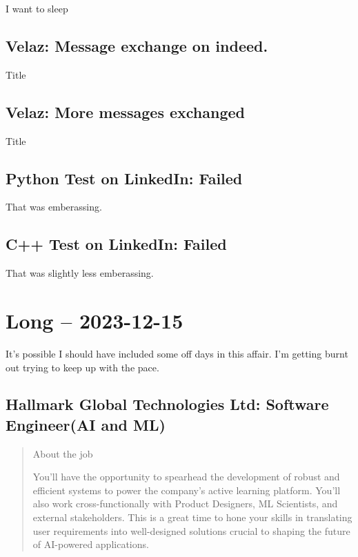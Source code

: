 \documentclass[
	letterpaper, %
	12pt, %
]{CSSullivanBusinessReport}
\begin{document}
I want to sleep



\subsection[Velaz]{Velaz: Message exchange on indeed. }

Title


\subsection[Velaz]{Velaz: More messages exchanged}

Title


\subsection[Python Test]{Python Test on LinkedIn: Failed}

That was emberassing. 


\subsection[C++ Test]{C++ Test on LinkedIn: Failed}

That was slightly less emberassing. 


\section[15 Dec: Short]{Long -- 2023-12-15} %

It's possible I should have included some off days in this affair. I'm getting burnt out trying to keep up with the pace. 


\subsection[Hallmark Global Technologies Ltd]{Hallmark Global Technologies Ltd: Software Engineer(AI and ML)}

\begin{quote}
	About the job
	
	You'll have the opportunity to spearhead the development of robust and efficient systems to power the company's active learning platform. You'll also work cross-functionally with Product Designers, ML Scientists, and external stakeholders. This is a great time to hone your skills in translating user requirements into well-designed solutions crucial to shaping the future of AI-powered applications.

\end{quote}
\end{document}
